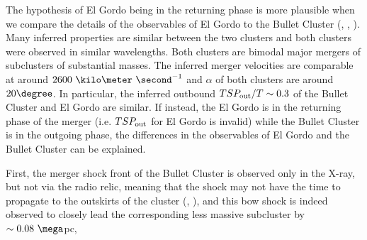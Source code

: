 The hypothesis of El Gordo being in the returning phase is more plausible when
we compare the details of the observables of El Gordo to the Bullet
Cluster (\citealt{Bradac2006b}, \citealt{Springel2007},
\citealt{Mastropietro2008a}).
Many inferred properties are similar between the two clusters and
both clusters were observed in similar wavelengths. Both clusters are
bimodal major mergers of subclusters of substantial masses. The inferred
merger velocities are comparable at around $2600~\kilo\meter~\second^{-1}$
and $\alpha$ of both clusters are around $20 \degree$. 
In particular, the inferred outbound $TSP_{\rm out} / T \sim 0.3$ of the Bullet Cluster and El Gordo
are similar. If instead, the El Gordo
is in the returning phase of the merger (i.e. $TSP_{\rm out}$ for El Gordo is
invalid) while the Bullet Cluster is in the outgoing phase, the differences
in the observables of El Gordo and the Bullet Cluster can be explained.\par
First, the merger shock front of the Bullet Cluster is
observed only in the X-ray, but not via the radio relic, meaning that the shock may not have the
time to propagate to the outskirts of the cluster (\citealt{Bruggen2011},
\citealt{Markevitch2007}), and this bow shock is indeed observed to closely
lead the corresponding less massive subcluster by $\sim 0.08~\mega$pc,
